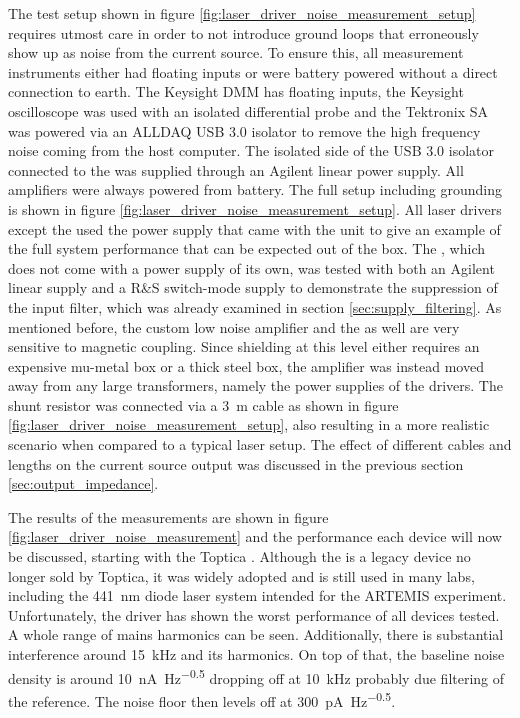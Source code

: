 The test setup shown in figure \ref{fig:laser_driver_noise_measurement_setup} requires utmost care in order to not introduce ground loops that erroneously show up as noise from the current source. To ensure this, all measurement instruments either had floating inputs or were battery powered without a direct connection to earth. The Keysight  DMM has floating inputs, the Keysight  oscilloscope was used with an isolated differential probe and the Tektronix  SA was powered via an ALLDAQ  USB 3.0 isolator to remove the high frequency noise coming from the host computer. The isolated side of the USB 3.0 isolator connected to the  was supplied through an Agilent  linear power supply. All amplifiers were always powered from battery. The full setup including grounding is shown in figure \ref{fig:laser_driver_noise_measurement_setup}. All laser drivers except the  used the power supply that came with the unit to give an example of the full system performance that can be expected out of the box. The , which does not come with a power supply of its own, was tested with both an Agilent  linear supply and a R\&S  switch-mode supply to demonstrate the suppression of the input filter, which was already examined in section \ref{sec:supply_filtering}. As mentioned before, the custom low noise amplifier and the  as well are very sensitive to magnetic coupling. Since shielding at this level either requires an expensive mu-metal box or a thick steel box, the amplifier was instead moved away from any large transformers, namely the power supplies of the drivers. The shunt resistor was connected via a \qty{3}{\m} cable as shown in figure \ref{fig:laser_driver_noise_measurement_setup}, also resulting in a more realistic scenario when compared to a typical laser setup. The effect of different cables and lengths on the current source output was discussed in the previous section \ref{sec:output_impedance}.

The results of the measurements are shown in figure \ref{fig:laser_driver_noise_measurement} and the performance each device will now be discussed, starting with the Toptica . Although the  is a legacy device no longer sold by Toptica, it was widely adopted and is still used in many labs, including the \qty{441}{\nm} diode laser system intended for the ARTEMIS experiment. Unfortunately, the driver has shown the worst performance of all devices tested. A whole range of mains harmonics can be seen. Additionally, there is substantial interference around \qty{15}{\kHz} and its harmonics. On top of that, the baseline noise density is around \qty{10}{\nA \per \Hz\tothe{0.5}} dropping off at \qty{10}{\kHz} probably due filtering of the reference. The noise floor then levels off at \qty{300}{\pA \per \Hz\tothe{0.5}}.

